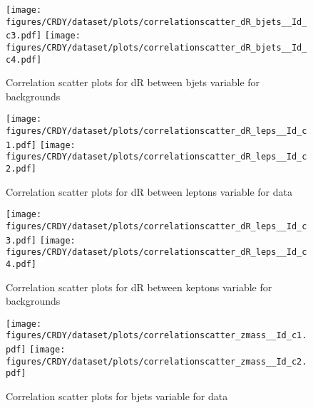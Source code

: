 \begin{figure}[!htb]%
\centering
\texttt{[image: figures/CRDY/dataset/plots/correlationscatter\_dR\_bjets\_\_Id\_c3.pdf]}
\texttt{[image: figures/CRDY/dataset/plots/correlationscatter\_dR\_bjets\_\_Id\_c4.pdf]}
\caption{ Correlation scatter plots for dR between bjets variable for backgrounds}%
\label{fig:correlations_CRDY_drbjets_BG}                                                       
\end{figure}\clearpage




\begin{figure}[!htb]%
\centering
\texttt{[image: figures/CRDY/dataset/plots/correlationscatter\_dR\_leps\_\_Id\_c1.pdf]}
\texttt{[image: figures/CRDY/dataset/plots/correlationscatter\_dR\_leps\_\_Id\_c2.pdf]}
\caption{ Correlation scatter plots for dR between leptons variable for data}%
\label{fig:correlations_CRDY_drleps_S}                                                       
\end{figure}\clearpage



\begin{figure}[!htb]%
\centering
\texttt{[image: figures/CRDY/dataset/plots/correlationscatter\_dR\_leps\_\_Id\_c3.pdf]}
\texttt{[image: figures/CRDY/dataset/plots/correlationscatter\_dR\_leps\_\_Id\_c4.pdf]}
\caption{ Correlation scatter plots for dR between keptons variable for backgrounds}%
\label{fig:correlations_CRDY_drleps_BG}                                                       
\end{figure}\clearpage



\begin{figure}[!htb]%
\centering
\texttt{[image: figures/CRDY/dataset/plots/correlationscatter\_zmass\_\_Id\_c1.pdf]}
\texttt{[image: figures/CRDY/dataset/plots/correlationscatter\_zmass\_\_Id\_c2.pdf]}
\caption{ Correlation scatter plots for \Zll bjets variable for data}%
\label{fig:correlations_CRDY_zmass_S}                                                       
\end{figure}\clearpage




